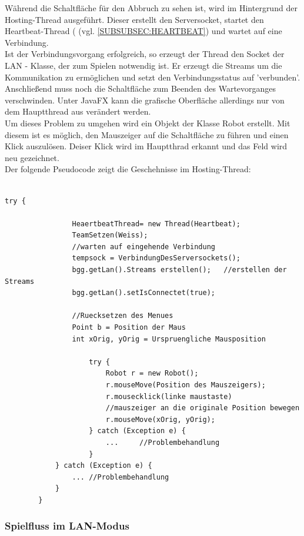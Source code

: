 \documentclass[12pt,a4paper]{article}
\begin{document}
Während die Schaltfläche für den Abbruch zu sehen ist, wird im Hintergrund der Hosting-Thread ausgeführt. Dieser erstellt den Serversocket, startet den Heartbeat-Thread (  (vgl. \ref{SUBSUBSEC:HEARTBEAT}) und wartet auf eine Verbindung. \\[2ex]
Ist der Verbindungsvorgang erfolgreich, so erzeugt der Thread den Socket der LAN - Klasse, der zum Spielen notwendig ist. Er erzeugt die Streams um die Kommunikation zu ermöglichen und setzt den Verbindungsstatus auf 'verbunden'. \\
Anschließend muss noch die Schaltfläche zum Beenden des Wartevorganges verschwinden. Unter JavaFX kann die grafische Oberfläche allerdings nur von dem Hauptthread aus verändert werden.\\ Um dieses Problem zu umgehen wird ein Objekt der Klasse Robot erstellt. Mit diesem ist es möglich, den Mauszeiger auf die Schaltfläche zu führen und einen Klick auszulösen. 
Deiser Klick wird im Hauptthrad erkannt und das Feld wird neu gezeichnet. \\
Der folgende Pseudocode zeigt die Geschehnisse im Hosting-Thread:\\
\lstset{language=java}
\begin{lstlisting}

try {
				
				HeaertbeatThread= new Thread(Heartbeat);
				TeamSetzen(Weiss);
				//warten auf eingehende Verbindung
				tempsock = VerbindungDesServersockets();
				bgg.getLan().Streams erstellen();	//erstellen der Streams
				bgg.getLan().setIsConnectet(true);
				
				//Ruecksetzen des Menues
				Point b = Position der Maus
				int xOrig, yOrig = Urspruengliche Mausposition
		      
		            try {
		                Robot r = new Robot();
		                r.mouseMove(Position des Mauszeigers);
		                r.mousecklick(linke maustaste)
		                //mauszeiger an die originale Position bewegen
		                r.mouseMove(xOrig, yOrig);
		            } catch (Exception e) {
		                ...  	//Problembehandlung
		            }
			} catch (Exception e) {
				...	//Problembehandlung
			}		
		}

\end{lstlisting}

\subsubsection{Spielfluss im LAN-Modus}
\end{document}
